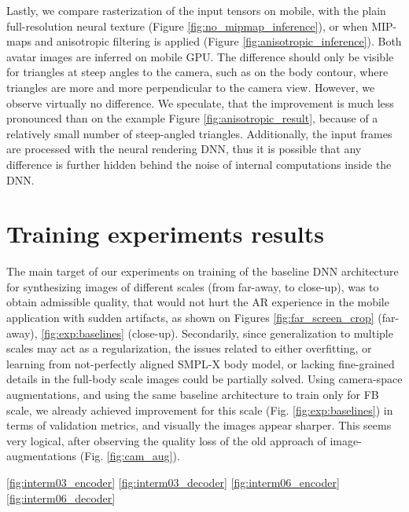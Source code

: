 Lastly, we compare rasterization of the input tensors on mobile, with the plain full-resolution neural texture (Figure \ref{fig:no_mipmap_inference}), or when MIP-maps and anisotropic filtering is applied (Figure \ref{fig:anisotropic_inference}). Both avatar images are inferred on mobile GPU. The difference should only be visible for triangles at steep angles to the camera, such as on the body contour, where triangles are more and more perpendicular to the camera view. However, we observe virtually no difference. We speculate, that the improvement is much less pronounced than on the example Figure \ref{fig:anisotropic_result}, because of a relatively small number of steep-angled triangles. Additionally, the input frames are processed with the neural rendering  DNN, thus it is possible that any difference is further hidden behind the noise of internal computations inside the DNN.

\section{Training experiments results}\label{res:training}

The main target of our experiments on training of the baseline DNN architecture for synthesizing images of different scales (from far-away, to close-up), was to obtain admissible quality, that would not hurt the AR experience in the mobile application with sudden artifacts, as shown on Figures \ref{fig:far_screen_crop} (far-away), \ref{fig:exp:baselines} (close-up). Secondarily, since generalization to multiple scales may act as a regularization, the issues related to either overfitting, or learning from not-perfectly aligned SMPL-X body model, or lacking fine-grained details in the full-body scale images could be partially solved. Using camera-space augmentations, and using the same baseline architecture to train only for FB scale, we already achieved improvement for this scale (Fig. \ref{fig:exp:baselines}) in terms of validation metrics, and visually the images appear sharper. This seems very logical, after observing the quality loss of the old approach of image-augmentations (Fig. \ref{fig:cam_aug}).
 
\ref{fig:interm03_encoder} \ref{fig:interm03_decoder} \ref{fig:interm06_encoder} \ref{fig:interm06_decoder}


